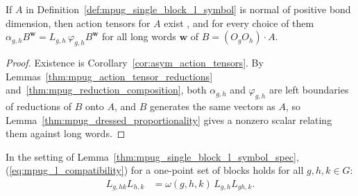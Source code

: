 \begin{lemma}
    \label{thm:mpug_single_block_l_symbol_spec}
    \leanok
    If $A$ in Definition~\ref{def:mpug_single_block_l_symbol} is normal
    of positive bond dimension, then action tensors for $A$ exist
    \cite[lines~1064--1090]{GarreRubio2023MPOSym}, and for every choice of
    them $\alpha_{g,h}B^{\mathbf w}=L_{g,h}\,\varphi_{g,h}B^{\mathbf w}$ for
    all long words $\mathbf w$ of $B=(O_gO_h)\cdot A$.
\end{lemma}

\begin{proof}\leanok
    Existence is Corollary~\ref{cor:asym_action_tensors}. By
    Lemmas~\ref{thm:mpug_action_tensor_reductions}
    and~\ref{thm:mpug_reduction_composition}, both $\alpha_{g,h}$ and
    $\varphi_{g,h}$ are left boundaries of reductions of $B$ onto $A$, and
    $B$ generates the same vectors as $A$, so
    Lemma~\ref{thm:mpug_dressed_proportionality} gives a nonzero scalar
    relating them against long words.
\end{proof}

\begin{lemma}
    \label{thm:mpug_single_block_l_compatibility}
    \leanok
    In the setting of Lemma~\ref{thm:mpug_single_block_l_symbol_spec},
    (\ref{eq:mpug_l_compatibility}) for a one-point set of blocks holds for
    all $g,h,k\in G$:
    \begin{align}
        L_{g,hk}L_{h,k}
         & =\omega(g,h,k)\,L_{g,h}L_{gh,k}.
    \end{align}
\end{lemma}

